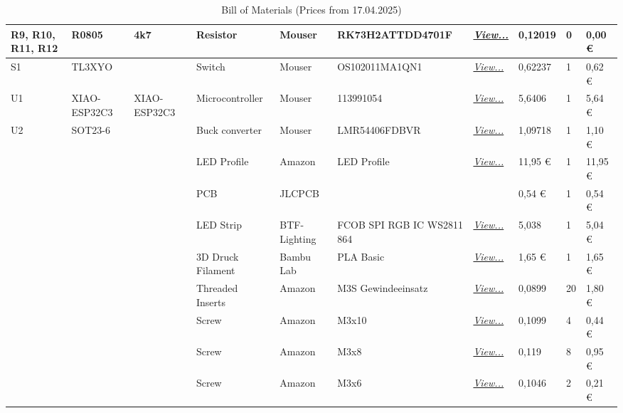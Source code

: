 \begin{table}[H]
{\begin{tabular}{|l|l|l|l|l|l|l|l|l|l|}
			R9, R10, R11, R12 & R0805 & 4k7 & Resistor & Mouser & RK73H2ATTDD4701F & \href{https://www.mouser.de/ProductDetail/660-RK73H2ATTDD4701F}{\textit{View...}} & 0,12019 & 0 & 0,00 € \\ \hline
			S1 & TL3XYO &  & Switch & Mouser & OS102011MA1QN1 & \href{https://www.mouser.de/ProductDetail/611-OS102011MA1QN1}{\textit{View...}} & 0,62237 & 1 & 0,62 € \\ \hline
			U1 & XIAO-ESP32C3 & XIAO-ESP32C3 & Microcontroller & Mouser & 113991054 & \href{https://www.mouser.de/ProductDetail/713-113991054}{\textit{View...}} & 5,6406 & 1 & 5,64 € \\ \hline
			U2 & SOT23-6 &  & Buck converter & Mouser & LMR54406FDBVR & \href{https://www.mouser.de/ProductDetail/595-LMR54406FDBVR}{\textit{View...}} & 1,09718 & 1 & 1,10 € \\ \hline
			&  &  & LED Profile & Amazon & LED Profile & \href{https://www.amazon.de/dp/B07548TMKN?psc=1\&ref=ppx\_yo2ov\_dt\_b\_product\_details}{\textit{View...}} & 11,95 € & 1 & 11,95 € \\ \hline
			&  &  & PCB & JLCPCB &  &  & 0,54 € & 1 & 0,54 € \\ \hline
			&  &  & LED Strip &BTF-Lighting &FCOB SPI RGB IC WS2811 864 & \href{https://www.btf-lighting.com/en-intl/products/fcob-spi-rgb-ic-ws2811-864leds-12v-24v-cob-lights-ra90?variant=46161432772834}{\textit{View...}} & 5,038 & 1 & 5,04 € \\ \hline
			&  &  & 3D Druck Filament & Bambu Lab & PLA Basic & \href{https://eu.store.bambulab.com/de/products/pla-basic-filament-de?variant=43923829129435}{\textit{View...}} & 1,65 € & 1 & 1,65 € \\ \hline
			&  &  & Threaded Inserts & Amazon & M3S Gewindeeinsatz & \href{https://www.amazon.de/dp/B09ZHSGHXD?ref\_=ppx\_hzsearch\_conn\_dt\_b\_fed\_asin\_title\_5\&th=1}{\textit{View...}} & 0,0899 & 20 & 1,80 € \\ \hline
			&  &  & Screw & Amazon & M3x10 & \href{https://www.amazon.de/gp/product/B01MY4VXCS/ref=ox\_sc\_act\_title\_2?smid=AQ1IBDB6G2RRD\&psc=1}{\textit{View...}} & 0,1099 & 4 & 0,44 € \\ \hline
			&  &  & Screw & Amazon & M3x8 & \href{https://www.amazon.de/gp/product/B08K8FQWCZ/ref=ox\_sc\_act\_image\_1?smid=A1KGD9U4C0ZGWS\&th=1}{\textit{View...}} & 0,119 & 8 & 0,95 € \\ \hline
			&  &  & Screw & Amazon & M3x6 & \href{https://www.amazon.de/gp/product/B08K8F4FL6/ref=ox\_sc\_act\_image\_3?smid=A1KGD9U4C0ZGWS\&th=1}{\textit{View...}} & 0,1046 & 2 & 0,21 € \\ \hline
		\end{tabular}
	}
	\caption[Bill of Materials]{Bill of Materials (Prices from 17.04.2025)}
	\label{tab:bom}
\end{table}
\clearpage

